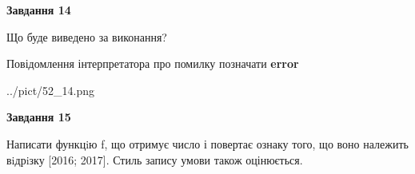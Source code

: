 \documentclass[11pt, ukrainian]{article}
\begin{document}
{\begin {large}
{\begin {center}\textbf{Завдання 14}\end {center}}\par
Що буде виведено за виконання? \par
Повідомлення інтерпретатора про помилку позначати \textbf{error}

\begin{center}
	{../pict/52_14.png}
\end{center}
\newpage

{\begin {center}\textbf{Завдання 15}\end {center}}\par

Написати функцiю f, що отримує число і повертає ознаку того, що воно належить вiдрiзку [2016; 2017]. Стиль запису умови також оцінюється.\par
\newpage

\end {large}}
\end{document}
